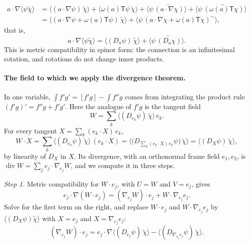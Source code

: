 \begin{align*}
a\cdot\nabla\langle\psi\widetilde\chi\rangle &= \big\langle (a\cdot\nabla\psi)\,\widetilde\chi\big\rangle + \big\langle \omega(a)\mathsf T\psi\,\widetilde\chi\big\rangle + \big\langle \psi\,\widetilde{(a\cdot\nabla\chi)}\big\rangle + \big\langle\psi\,\widetilde{(\omega(a)\mathsf T\chi)}\big\rangle \\
&= \big\langle (a\cdot\nabla\psi + \omega(a)\mathsf T\psi)\,\widetilde\chi\big\rangle + \big\langle \psi\,(a\cdot\nabla\chi + \omega(a)\mathsf T\chi)^\sim\big\rangle ,
\end{align*}
that is,
\begin{equation}
\label{eqn:r2_product}
a\cdot\nabla\langle\psi\widetilde\chi\rangle = \big\langle (D_a\psi)\,\widetilde\chi\big\rangle + \big\langle \psi\,\widetilde{(D_a\chi)}\big\rangle .
\end{equation}
This is metric compatibility in spinor form: the connection is an infinitesimal rotation, and rotations do not change inner products.

\paragraph{The field to which we apply the divergence theorem.} In one variable, $\int f'g' = [f'g] - \int f''g$ comes from integrating the product rule $(f'g)' = f''g + f'g'$. Here the analogue of $f'g$ is the tangent field
\begin{equation*}
W = \sum_k \big\langle (D_{e_k}\psi)\,\widetilde\chi\big\rangle\, e_k .
\end{equation*}
For every tangent $X = \sum_k (e_k\cdot X)\, e_k$,
\begin{equation*}
W\cdot X = \sum_k \big\langle (D_{e_k}\psi)\,\widetilde\chi\big\rangle\,(e_k\cdot X) = \Big\langle \Big(D_{\sum_k (e_k\cdot X)\, e_k}\psi\Big)\,\widetilde\chi\Big\rangle = \big\langle (D_X\psi)\,\widetilde\chi\big\rangle ,
\end{equation*}
by linearity of $D_X$ in $X$. Its divergence, with an orthonormal frame field $e_1, e_2$, is $\operatorname{div}W = \sum_j e_j\cdot\nabla_{e_j}W$, and we compute it in three steps.

\emph{Step 1.} Metric compatibility for $W\cdot e_j$, with $U = W$ and $V = e_j$, gives
\begin{equation*}
e_j\cdot\nabla(W\cdot e_j) = (\nabla_{e_j}W)\cdot e_j + W\cdot\nabla_{e_j}e_j .
\end{equation*}
Solve for the first term on the right, and replace $W\cdot e_j$ and $W\cdot\nabla_{e_j}e_j$ by $\langle (D_X\psi)\widetilde\chi\rangle$ with $X = e_j$ and $X = \nabla_{e_j}e_j$:
\begin{equation*}
(\nabla_{e_j}W)\cdot e_j = e_j\cdot\nabla\big\langle (D_{e_j}\psi)\,\widetilde\chi\big\rangle - \big\langle (D_{\nabla_{e_j}e_j}\psi)\,\widetilde\chi\big\rangle .
\end{equation*}

